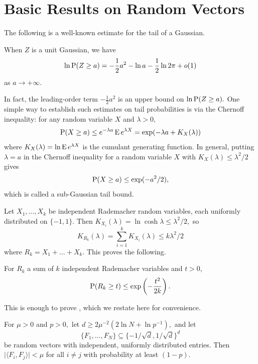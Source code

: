 \section{Basic Results on Random Vectors \label{appendix:basic}}

The following is a well-known estimate for the tail of a Gaussian.

\begin{proposition}
When $Z$ is a unit Gaussian, we have
$$
\ln \operatorname{P}(Z \ge a) = - \frac 1 2 a^2 - \ln a - \frac 1 2 \ln 2 \pi + o(1)
$$
as $a \to + \infty.$
\end{proposition}

In fact, the leading-order term $- \frac 1 2 a^2$ is an upper bound on $\ln \operatorname{P}(Z \ge a).$ One simple way to establish such estimates on tail probabilities is via the Chernoff inequality: for any random variable $X$ and $\lambda > 0,$
$$
\operatorname{P}(X \ge a) \le e^{-\lambda a} \operatorname{E} e^{\lambda X} = \exp(- \lambda a + K_X(\lambda))
$$
where $K_X(\lambda) = \ln \operatorname{E} e^{\lambda X}$ is the cumulant generating function. In general, putting $\lambda = a$ in the Chernoff inequality for a random variable $X$ with $K_X(\lambda) \le \lambda^2 / 2$ gives
$$
\operatorname{P}(X \ge a) \le \exp(-a^2/2),
$$
which is called a sub-Gaussian tail bound.

Let $X_1, \dots, X_k$ be independent Rademacher random variables, each uniformly distributed on $\{-1, 1\}.$ Then $K_{X_i}(\lambda) = \ln \cosh \lambda \le \lambda^2 / 2,$ so
$$
K_{R_k}(\lambda) = \sum_{i=1}^k K_{X_i}(\lambda) \le k \lambda^2 / 2
$$
where $R_k = X_1 + \dots + X_k.$ This proves the following.

\begin{proposition}
\label{prop:rademacher-chernoff}
For $R_k$ a sum of $k$ independent Rademacher variables and $t > 0,$
$$
\operatorname{P}(R_k \ge t) \le \exp\left(-\frac{t^2}{2k}\right).
$$
\end{proposition}

This is enough to prove , which we restate here for convenience.

\begin{proposition*}
	For $\mu > 0$ and $p > 0,$ let $d \ge 2 \mu^{-2} (2 \ln N + \ln p^{-1}),$ and let
	$$
		\{ F_1, \dots, F_N \} \subseteq \{ - 1/\sqrt d,  1 / \sqrt d \}^d
	$$
	be random vectors with independent, uniformly distributed entries. Then $\lvert \langle F_i, F_j \rangle \rvert < \mu$ for all $i \neq j$ with probability at least $(1 - p).$
\end{proposition*}

